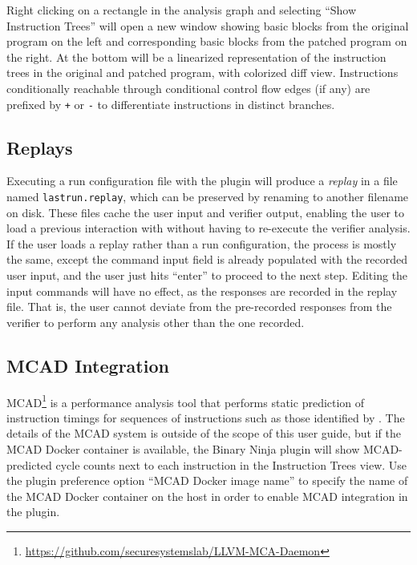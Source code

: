 Right clicking on a rectangle in the \pate{} analysis graph and selecting ``Show Instruction Trees'' will open a new window showing basic blocks from the original program on the left and corresponding basic blocks from the patched program on the right.
At the bottom will be a linearized representation of the instruction trees in the original and patched program, with colorized diff view.
Instructions conditionally reachable through conditional control flow edges (if any) are prefixed by \texttt{+} or \texttt{-} to differentiate instructions in distinct branches.

\subsection{Replays}

Executing a run configuration file with the \pate{} plugin will produce a \emph{replay} in a file named \texttt{lastrun.replay}, which can be preserved by renaming to another filename on disk.
These files cache the user input and verifier output, enabling the user to load a previous interaction with \pate{} without having to re-execute the verifier analysis.
If the user loads a replay rather than a run configuration, the process is mostly the same, except the command input field is already populated with the recorded user input, and the user just hits ``enter'' to proceed to the next step.
Editing the input commands will have no effect, as the responses are recorded in the replay file.
That is, the user cannot deviate from the pre-recorded responses from the \pate{} verifier to perform any analysis other than the one recorded.

\subsection{MCAD Integration}

MCAD\footnote{\url{https://github.com/securesystemslab/LLVM-MCA-Daemon}} is a performance analysis tool that performs static prediction of instruction timings for sequences of instructions such as those identified by \pate{}.
The details of the MCAD system is outside of the scope of this user guide, but if the MCAD Docker container is available, the \pate{} Binary Ninja plugin will show MCAD-predicted cycle counts next to each instruction in the Instruction Trees view.
Use the \pate{} plugin preference option ``MCAD Docker image name'' to specify the name of the MCAD Docker container on the host in order to enable MCAD integration in the \pate{} plugin.
